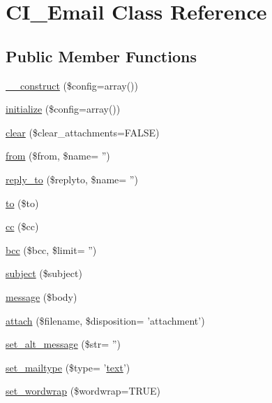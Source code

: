 \hypertarget{class_c_i___email}{\section{C\-I\-\_\-\-Email Class Reference}
\label{class_c_i___email}
}
\subsection*{Public Member Functions}
\begin{DoxyCompactItemize}
\item 
\hyperlink{class_c_i___email_af7f9493844d2d66e924e3c1df51ce616}{\-\_\-\-\_\-construct} (\$config=array())
\item 
\hyperlink{class_c_i___email_a481385e36d920f5a5005ace05c6cd016}{initialize} (\$config=array())
\item 
\hyperlink{class_c_i___email_a84399b20dfff67877099743270c68538}{clear} (\$clear\-\_\-attachments=F\-A\-L\-S\-E)
\item 
\hyperlink{class_c_i___email_af5636782915800ed1e28f907520b2af8}{from} (\$from, \$name= '')
\item 
\hyperlink{class_c_i___email_ad244902c2ebf2801454215eb6d7a813f}{reply\-\_\-to} (\$replyto, \$name= '')
\item 
\hyperlink{class_c_i___email_a453e853778ae341e4fb165551d1ba1aa}{to} (\$to)
\item 
\hyperlink{class_c_i___email_a785e883837f95eeffed21226563fc7e5}{cc} (\$cc)
\item 
\hyperlink{class_c_i___email_a630f55c2481b8810d109fbb876ced6cf}{bcc} (\$bcc, \$limit= '')
\item 
\hyperlink{class_c_i___email_aaa61b3aaa6cc4c90e26686e4bf41587a}{subject} (\$subject)
\item 
\hyperlink{class_c_i___email_a62559aacd297073072c30009daa8de86}{message} (\$body)
\item 
\hyperlink{class_c_i___email_ac24cd70faf3b380235506c94c6e73b1b}{attach} (\$filename, \$disposition= 'attachment')
\item 
\hyperlink{class_c_i___email_a561908f4ed3be1f6a0e7721cd12af0c5}{set\-\_\-alt\-\_\-message} (\$str= '')
\item 
\hyperlink{class_c_i___email_af4cf982fc57024935544c955f4a92723}{set\-\_\-mailtype} (\$type= '\hyperlink{mathquill_8js_afd670572c010bca545fd3952276dd249}{text}')
\item 
\hyperlink{class_c_i___email_a6abb8d5f17213eba1e243ca633da8084}{set\-\_\-wordwrap} (\$wordwrap=T\-R\-U\-E)

\end{DoxyCompactItemize}
